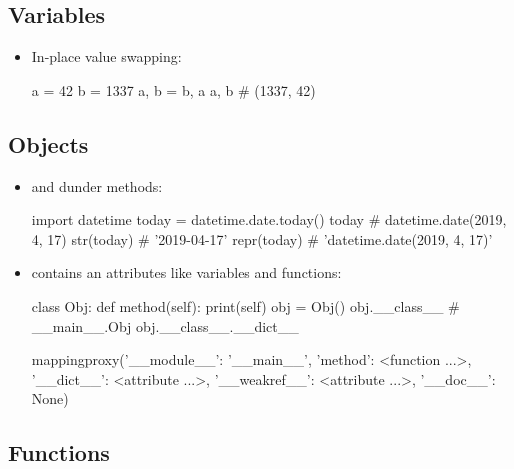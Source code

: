 \documentclass[rules]{cheatsheet}
\begin{document}
\subsection{Variables}

\begin{itemize}
  \item In-place value swapping:
  \begin{python}[gobble=4]
    a = 42
    b = 1337
    a, b = b, a
    a, b # (1337, 42)
  \end{python}
\end{itemize}

\subsection{Objects}

\begin{itemize}
  \item \href{https://docs.python.org/3/reference/datamodel.html#object.__repr__}{} and \href{https://docs.python.org/3/reference/datamodel.html#object.__str__}{} dunder methods:
  \begin{python}[gobble=4]
    import datetime
    today = datetime.date.today()
    today # datetime.date(2019, 4, 17)
    str(today) # '2019-04-17'
    repr(today) # 'datetime.date(2019, 4, 17)'
  \end{python}

  \item \href{https://docs.python.org/3/library/stdtypes.html#object.__dict__}{} contains an attributes like variables and functions:
  \begin{python}[gobble=4]
    class Obj:
      def method(self): print(self)
    obj = Obj()
    obj.__class__ # __main__.Obj
    obj.__class__.__dict__
  \end{python}\vspace{-\baselineskip}
  \begin{pyresult}[gobble=4]
    mappingproxy({'__module__': '__main__',
                  'method': <function ...>,
                  '__dict__': <attribute ...>,
                  '__weakref__': <attribute ...>,
                  '__doc__': None})
  \end{pyresult}
\end{itemize}

\subsection{Functions}
\end{document}
